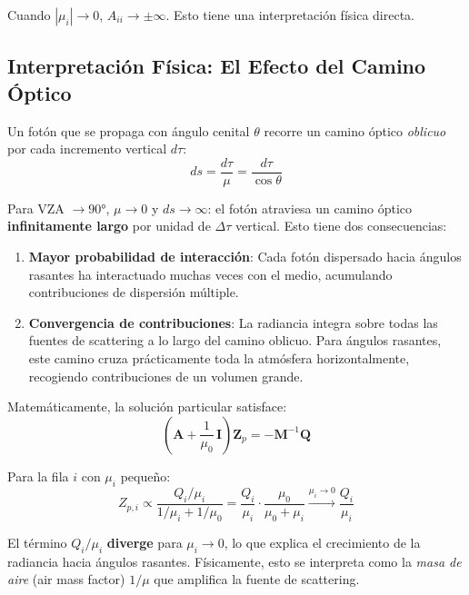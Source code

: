 \documentclass[a4paper,11pt]{article}
\begin{document}
Cuando $|\mu_i| \to 0$, $A_{ii} \to \pm\infty$. Esto tiene una interpretaci\'on
f\'isica directa.

\subsection{Interpretaci\'on F\'isica: El Efecto del Camino \'Optico}

Un fot\'on que se propaga con \'angulo cenital $\theta$ recorre un camino \'optico
\emph{oblicuo} por cada incremento vertical $d\tau$:
\begin{equation}
    ds = \frac{d\tau}{\mu} = \frac{d\tau}{\cos\theta}
\end{equation}

Para VZA $\to 90°$, $\mu \to 0$ y $ds \to \infty$: el fot\'on atraviesa un
camino \'optico \textbf{infinitamente largo} por unidad de $\Delta\tau$ vertical.
Esto tiene dos consecuencias:

\begin{enumerate}
    \item \textbf{Mayor probabilidad de interacci\'on}: Cada fot\'on dispersado
          hacia \'angulos rasantes ha interactuado muchas veces con el medio,
          acumulando contribuciones de dispersi\'on m\'ultiple.

    \item \textbf{Convergencia de contribuciones}: La radiancia integra sobre
          todas las fuentes de scattering a lo largo del camino oblicuo. Para
          \'angulos rasantes, este camino cruza pr\'acticamente toda la atm\'osfera
          horizontalmente, recogiendo contribuciones de un volumen grande.
\end{enumerate}

Matem\'aticamente, la soluci\'on particular satisface:
\begin{equation}
    \left(\mathbf{A} + \frac{1}{\mu_0}\,\mathbf{I}\right)\mathbf{Z}_p
    = -\mathbf{M}^{-1}\mathbf{Q}
\end{equation}

Para la fila $i$ con $\mu_i$ peque\~no:
\begin{equation}
    Z_{p,i} \propto \frac{Q_i / \mu_i}{1/\mu_i + 1/\mu_0}
    = \frac{Q_i}{\mu_i} \cdot \frac{\mu_0}{\mu_0 + \mu_i}
    \xrightarrow{\mu_i \to 0} \frac{Q_i}{\mu_i}
\end{equation}

El t\'ermino $Q_i/\mu_i$ \textbf{diverge} para $\mu_i \to 0$, lo que explica el
crecimiento de la radiancia hacia \'angulos rasantes. F\'isicamente, esto se
interpreta como la \emph{masa de aire} (air mass factor) $1/\mu$ que amplifica
la fuente de scattering.
\end{document}
